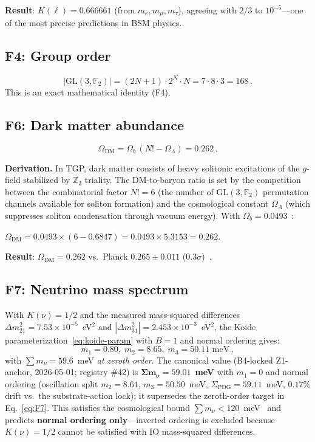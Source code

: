\documentclass[aps,prd,twocolumn,superscriptaddress,showpacs,
  nofootinbib,floatfix,longbibliography]{revtex4-2}
\newcommand{\OL}{\Omega_\Lambda}
\newcommand{\GL}{\mathrm{GL}(3,\mathbb{F}_2)}
\newcommand{\ZZ}{\mathbb{Z}}
\begin{document}
\textbf{Result}: $K(\ell) = 0.666661$ (from $m_e, m_\mu, m_\tau$),
agreeing with $2/3$ to $10^{-5}$---one of the most precise
predictions in BSM physics.


\subsection{F4: Group order}\label{ssec:F4}

\begin{equation}\label{eq:F4}
  \boxed{|\GL| = (2N{+}1) \cdot 2^N \cdot N = 7 \cdot 8 \cdot 3 = 168}\,.
\end{equation}
This is an exact mathematical identity (F4).


\subsection{F6: Dark matter abundance}\label{ssec:F6}

\begin{equation}\label{eq:F6}
  \boxed{\Omega_\mathrm{DM} = \Omega_b\,(N! - \OL) = 0.262}\,.
\end{equation}

\textbf{Derivation.}
In TGP, dark matter consists of heavy solitonic excitations of the
$g$-field stabilized by $\ZZ_3$ triality. The DM-to-baryon ratio
is set by the competition between the combinatorial factor $N! = 6$
(the number of $\GL$ permutation channels available for soliton
formation) and the cosmological constant $\OL$ (which suppresses
soliton condensation through vacuum energy). With
$\Omega_b = 0.0493$~\cite{Planck2018}:

$\Omega_\mathrm{DM} = 0.0493 \times (6 - 0.6847) = 0.0493 \times 5.3153 = 0.262$.

\textbf{Result}: $\Omega_\mathrm{DM} = 0.262$ vs.\ Planck
$0.265 \pm 0.011$ ($0.3\sigma$)~\cite{Planck2018}.


\subsection{F7: Neutrino mass spectrum}\label{ssec:F7}

With $K(\nu) = 1/2$ and the measured mass-squared differences
$\Delta m_{21}^2 = 7.53 \times 10^{-5}$~eV$^2$ and
$|\Delta m_{31}^2| = 2.453 \times 10^{-3}$~eV$^2$, the Koide
parameterization~\eqref{eq:koide-param} with $B = 1$ and normal
ordering gives:
\begin{equation}\label{eq:F7}
  \boxed{m_1 = 0.80,\; m_2 = 8.65,\; m_3 = 50.11 \text{ meV}}\,,
\end{equation}
with $\sum m_\nu = 59.6$~meV \emph{at zeroth order}. The canonical
value (B4-locked Z1-anchor, 2026-05-01; registry \#42) is
$\boldsymbol{\Sigma m_\nu = 59.01}$~\textbf{meV} with $m_1 = 0$ and
normal ordering (oscillation split $m_2 = 8.61$, $m_3 = 50.50$~meV,
$\Sigma_\mathrm{PDG} = 59.11$~meV, $0.17\%$ drift vs.\ the
substrate-action lock); it supersedes the zeroth-order target
in Eq.~\eqref{eq:F7}. This satisfies the cosmological bound
$\sum m_\nu < 120$~meV~\cite{Planck2018} and predicts
\textbf{normal ordering only}---inverted ordering is excluded because
$K(\nu) = 1/2$ cannot be satisfied with IO mass-squared differences.
\end{document}
